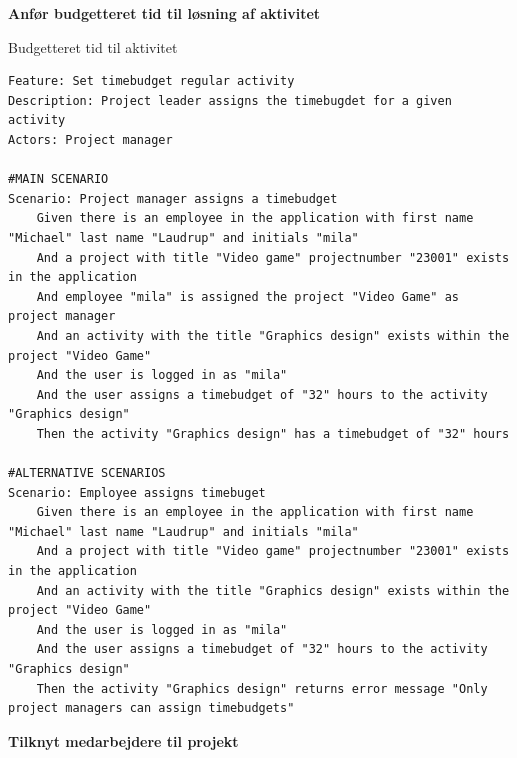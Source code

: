 \textbf{Anfør budgetteret tid til løsning af aktivitet}
\begin{listing}[H]
    \centering
    \caption{Budgetteret tid til aktivitet}\label{lst:budget_time}
    \begin{verbatim}
Feature: Set timebudget regular activity
Description: Project leader assigns the timebugdet for a given activity
Actors: Project manager

#MAIN SCENARIO
Scenario: Project manager assigns a timebudget
    Given there is an employee in the application with first name "Michael" last name "Laudrup" and initials "mila"
    And a project with title "Video game" projectnumber "23001" exists in the application
    And employee "mila" is assigned the project "Video Game" as project manager
    And an activity with the title "Graphics design" exists within the project "Video Game"
    And the user is logged in as "mila"
    And the user assigns a timebudget of "32" hours to the activity "Graphics design"
    Then the activity "Graphics design" has a timebudget of "32" hours

#ALTERNATIVE SCENARIOS
Scenario: Employee assigns timebuget
    Given there is an employee in the application with first name "Michael" last name "Laudrup" and initials "mila"
    And a project with title "Video game" projectnumber "23001" exists in the application
    And an activity with the title "Graphics design" exists within the project "Video Game"
    And the user is logged in as "mila"
    And the user assigns a timebudget of "32" hours to the activity "Graphics design"
    Then the activity "Graphics design" returns error message "Only project managers can assign timebudgets"
    \end{verbatim}
\end{listing}\newpage
\textbf{Tilknyt medarbejdere til projekt}
